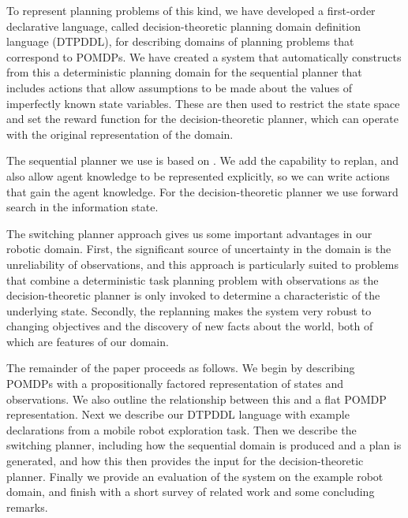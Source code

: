 To represent planning problems of this kind, we have developed a
first-order declarative language, called decision-theoretic planning
domain definition language (DTPDDL), for describing domains of
planning problems that correspond to POMDPs. We have created a system
that automatically constructs from this a deterministic planning domain
for the sequential planner that includes actions that allow
assumptions to be made about the values of imperfectly known state
variables. These are then used to restrict the state space and set the
reward function for the decision-theoretic planner, which can operate
with the original representation of the domain.

The sequential planner we use is based
on \fastdownward \cite{fast-downward}. We add the capability to
replan, and also allow agent knowledge to be represented explicitly,
so we can write actions that gain the agent knowledge. For the
decision-theoretic planner we use forward search in the information
state.

The switching planner approach gives us some important advantages in
our robotic domain. First, the significant source of uncertainty in
the domain is the unreliability of observations, and this approach is
particularly suited to problems that combine a deterministic task
planning problem with observations as the decision-theoretic planner
is only invoked to determine a characteristic of the underlying
state. Secondly, the replanning makes the system very robust to
changing objectives and the discovery of new facts about the world, both of
which are features of our domain.

The remainder of the paper proceeds as follows. We begin by describing
POMDPs with a propositionally factored representation of states and
observations. We also outline the relationship between this and a flat
POMDP representation. Next we describe our DTPDDL language with
example declarations from a mobile robot exploration task. Then we
describe the switching planner, including how the sequential domain is
produced and a plan is generated, and how this then provides the input
for the decision-theoretic planner. Finally we provide an evaluation
of the system on the example robot domain, and finish with a short
survey of related work and some concluding remarks.






